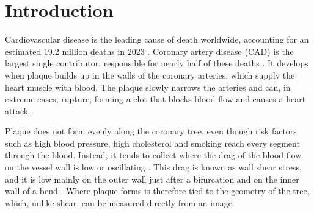 
\chapter{Introduction}
\label{ch:introduction}
Cardiovascular disease is the leading cause of death worldwide, accounting for an estimated 19.2
million deaths in 2023 \cite{stark2025gbd}.
Coronary artery disease (CAD) is the largest single contributor, responsible for nearly half of
these deaths \cite{stark2025gbd}.
It develops when plaque builds up in the walls of the coronary arteries, which supply the heart
muscle with blood.
The plaque slowly narrows the arteries and can, in extreme cases, rupture, forming a clot that
blocks blood flow and causes a heart attack \cite{libby2019atherosclerosis}.

Plaque does not form evenly along the coronary tree, even though risk factors such as high blood
pressure, high cholesterol and smoking reach every segment through the blood.
Instead, it tends to collect where the drag of the blood flow on the vessel wall is low or
oscillating \cite{chatzizisis2007ess}.
This drag is known as wall shear stress, and it is low mainly on the outer wall just after a
bifurcation and on the inner wall of a bend \cite{asakura1990flow}.
Where plaque forms is therefore tied to the geometry of the tree, which, unlike shear, can be
measured directly from an image.

